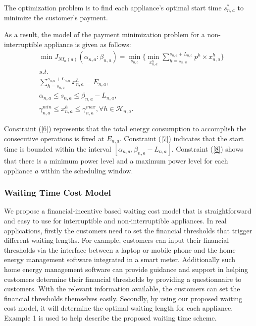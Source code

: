 \documentclass[10pt,journal]{IEEEtran}
\theoremstyle{definition}
\theoremstyle{plain} \newtheorem{theo}{Theorem} \newtheorem{prop}{Proposition}  \newtheorem{lemm}{Lemma}
\begin{document}
The optimization problem is to find each appliance's optimal start time $s_{n,a}^*$  to minimize the customer's payment. 

As a result, the model of the payment minimization problem for a non-interruptible appliance is given as follows:
\begin{align}
&\min J_{NI_n(a)}(\alpha_{n,a} \colon \beta_{n,a}) =  \underset{s_{n,a}} {\operatorname{\min}} \{ \underset{x_{n,a}^h} {\operatorname{\min}} \sum_{h=s_{n,a}}^{s_{n,a}+ L_{n,a}}  p^h \times  x_{n,a}^h \} \label{5}\\
 &s.t. \nonumber\\
  &\sum_{h=s_{n,a}}^{s_{n,a}+ L_{n,a}} x_{n,a}^h=E_{n,a}, \label{6}\\
  &\alpha_{n,a} \leq s_{n,a} \leq \beta_{n,a} - L_{n,a}, \label{7}\\
  & \gamma_{n,a}^{min}\leq x_{n,a}^h \leq \gamma_{n,a}^{max},      \forall h \in \mathcal{H}_{n,a}. \label{8}
  \end{align}
  
Constraint (\ref{6}) represents that the total energy consumption to accomplish the consecutive operations is fixed at $E_{n,a}$. Constraint (\ref{7}) indicates that the start time is bounded within the interval $[\alpha_{n,a}, \beta_{n,a}-L_{n,a}] $. Constraint (\ref{8}) shows that there is a minimum power level and a maximum power level for each appliance $a$ within the scheduling window. 




  

 
\subsubsection{Waiting Time Cost Model}




We propose a financial-incentive based waiting cost model that is straightforward and easy to use for interruptible and non-interruptible appliances. In real applications, firstly the customers need to set the financial thresholds that trigger different waiting lengths. For example, customers can input their financial thresholds via the interface between a laptop or mobile phone and the home energy management software integrated in a smart meter. Additionally such home energy management software can provide guidance and support in helping customers determine their financial thresholds by providing a questionnaire to customers. With the relevant information available, the customers can set the financial thresholds themselves easily. Secondly, by using our proposed waiting cost model, it will determine the optimal waiting length for each appliance. Example 1 is used to help describe the proposed waiting time scheme.
\end{document}
